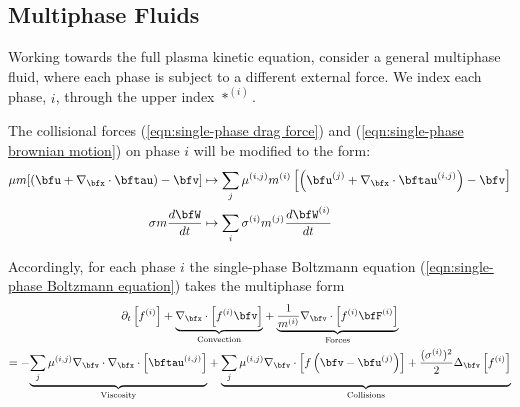 \subsection{Multiphase Fluids}

    Working towards the full plasma kinetic equation, consider a general multiphase fluid, where each phase is subject to a different external force. We index each phase, $i$, through the upper index $*^{(i)}$.

    The collisional forces (\ref{eqn:single-phase drag force}) and (\ref{eqn:single-phase brownian motion}) on phase $i$ will be modified to the form:  
    \begin{align}
        \mu m[(\bfu + \nabla_{\bfx}\cdot\bftau) - \bfv]  &\mapsto  \sum_{j}\mu^{(i, j)}m^{(i)}\left[\left(\bfu^{(j)} + \nabla_{\bfx}\cdot\bftau^{(i, j)}\right) - \bfv\right]  \\
        \sigma m\frac{d\bfW}{dt}  &\mapsto  \sum_{i}\sigma^{(i)}m^{(j)}\frac{d\bfW^{(i)}}{dt}
    \end{align}

    Accordingly, for each phase $i$ the single-phase Boltzmann equation (\ref{eqn:single-phase Boltzmann equation}) takes the multiphase form
    \begin{multline}\label{eqn:multiphase Boltzmann equation}
        \partial_{t}\left[f^{(i)}\right] + \underset{\textrm{Convection}}{\underbrace{\nabla_{\bfx}\cdot\left[f^{(i)}\bfv\right]}} + \underset{\textrm{Forces}}{\underbrace{\frac{1}{m^{(i)}}\nabla_{\bfv}\cdot\left[f^{(i)}\bfF^{(i)}\right]}}  \\  =  - \underset{\textrm{Viscosity}}{\underbrace{\sum_{j}\mu^{(i, j)}\nabla_{\bfv}\cdot\nabla_{\bfx}\cdot\left[\bftau^{(i, j)}\right]}} + \underset{\textrm{Collisions}}{\underbrace{\sum_{j}\mu^{(i, j)}\nabla_{\bfv}\cdot\left[f\left(\bfv - \bfu^{(j)}\right)\right] + \frac{(\sigma^{(i)})^{2}}{2}\Delta_{\bfv}\left[f^{(i)}\right]}}
    \end{multline}